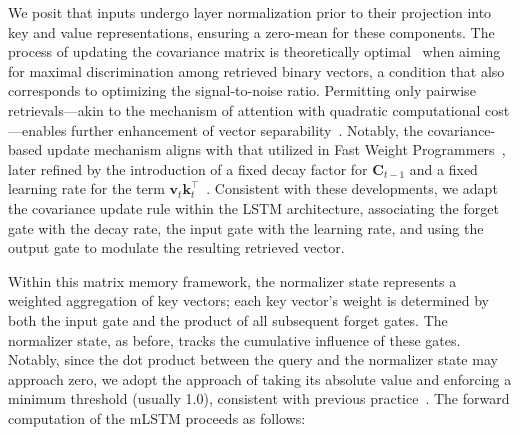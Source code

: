 We posit that inputs undergo layer normalization prior to their projection into key and value representations, ensuring a zero-mean for these components. The process of updating the covariance matrix is theoretically optimal~\citep{Dayan:91} when aiming for maximal discrimination among retrieved binary vectors, a condition that also corresponds to optimizing the signal-to-noise ratio. Permitting only pairwise retrievals—akin to the mechanism of attention with quadratic computational cost—enables further enhancement of vector separability~\citep{Krotov:16,Krotov:17,Ramsauer:21}. Notably, the covariance-based update mechanism aligns with that utilized in Fast Weight Programmers~\citep{Schmidhuber:92ncfastweights,Schlag:21}, later refined by the introduction of a fixed decay factor for $\mathbf{C}_{t-1}$ and a fixed learning rate for the term 
$\mathbf{v}_{t} \mathbf{k}_t ^\top$~\citep{Ba:16}. Consistent with these developments, we adapt the covariance update rule within the LSTM architecture, associating the forget gate with the decay rate, the input gate with the learning rate, and using the output gate to modulate the resulting retrieved vector.

Within this matrix memory framework, the normalizer state represents a weighted aggregation of key vectors; each key vector's weight is determined by both the input gate and the product of all subsequent forget gates. The normalizer state, as before, tracks the cumulative influence of these gates. Notably, since the dot product between the query and the normalizer state may approach zero, we adopt the approach of taking its absolute value and enforcing a minimum threshold (usually 1.0), consistent with previous practice~\citep{Sun:23arxiv}. The forward computation of the mLSTM proceeds as follows:

